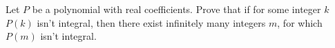 Let $P$ be a polynomial with real coefficients. Prove that if for some integer $k$ $P(k)$ isn't integral, then there exist infinitely many integers $m$, for which $P(m)$ isn't integral.